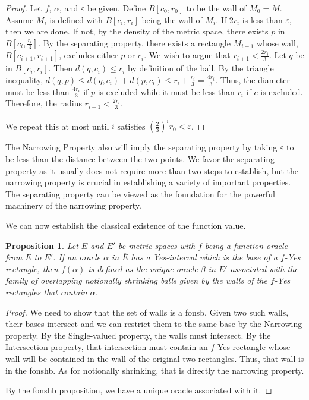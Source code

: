\documentclass[12pt]{article}
\newtheorem{proposition}{Proposition}[section]
\begin{document}
\begin{proof}
    Let $f$, $\alpha$, and $\varepsilon$ be given. Define $B[c_0, r_0]$ to be the wall of $M_0 =M $. Assume $M_i$ is defined with $B[c_i, r_i]$ being the wall of $M_i$. If $2r_i$ is less than $\varepsilon$, then we are done. If not, by the density of the metric space, there exists $p$ in $B[c_i, \frac{r_i}{3}]$. By the separating property, there exists a rectangle $M_{i+1}$ whose wall, $B[c_{i+1}, r_{i+1}]$, excludes either $ p$ or $c_i$. We wish to argue that $r_{i+1} < \frac{2r_i}{3}$. Let $q$ be in $B[c_i, r_i]$. Then $d(q, c_i) \leq r_i$ by definition of the ball.  By the triangle inequality, $d(q, p) \leq d(q,c_i) + d(p, c_i) \leq r_i + \frac{r_i}{3}= \frac{4 r_i}{3}$. Thus, the diameter must be less than $\frac{4r_i}{3}$ if $p$ is excluded while it must be less than $r_i$ if $c$ is excluded. Therefore, the radius $r_{i+1} < \frac{2r_i}{3}$. 

    We repeat this at most until $i$ satisfies $(\frac{2}{3})^i r_0 < \varepsilon$. 
\end{proof}

The Narrowing Property also will imply the separating property by taking $\varepsilon$ to be less than the distance between the two points. We favor the separating property as it usually does not require more than two steps to establish, but the narrowing property is crucial in establishing a variety of important properties. The separating property can be viewed as the foundation for the powerful machinery of the narrowing property. 

We can now establish the classical existence of the function value.

\begin{proposition}
Let $E$ and $E'$ be metric spaces with $f$ being a function oracle from $E$ to $E'$. If an oracle $\alpha$ in $\overline{E}$ has a Yes-interval which is the base of a $f$-Yes rectangle, then $f(\alpha)$ is defined as the unique oracle $\beta$ in $\overline{E'}$ associated with the family of overlapping notionally shrinking balls given by the walls of the $f$-Yes rectangles that contain $\alpha$. 
\end{proposition}

\begin{proof}
We need to show that the set of walls is a fonsb. Given two such walls, their bases intersect and we can restrict them to the same base by the Narrowing property. By the Single-valued property, the walls must intersect. By the Intersection property, that intersection must contain an $f$-Yes rectangle whose wall will be contained in the wall of the original two rectangles. Thus, that wall is in the fonshb. As for notionally shrinking, that is directly the narrowing property. 

By the fonshb proposition, we have a unique oracle associated with it. 
\end{proof}
\end{document}
